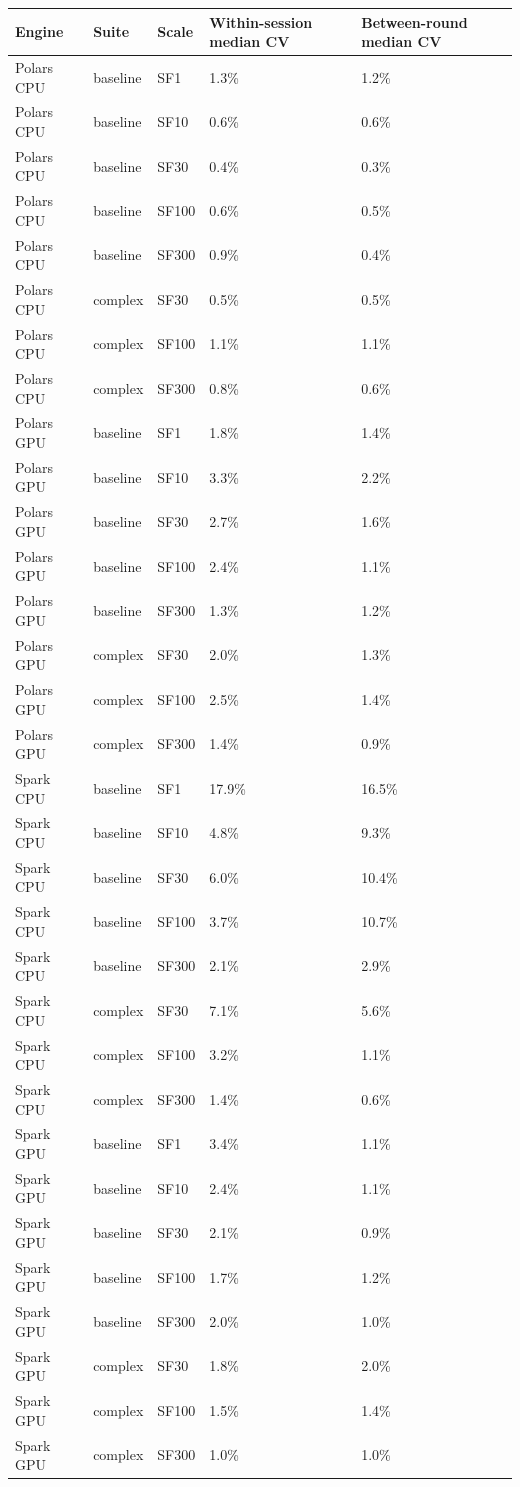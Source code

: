\begin{tabular}{lllll}
\toprule
Engine & Suite & Scale & Within-session median CV & Between-round median CV \\
\midrule
Polars CPU & baseline & SF1 & 1.3\% & 1.2\% \\
Polars CPU & baseline & SF10 & 0.6\% & 0.6\% \\
Polars CPU & baseline & SF30 & 0.4\% & 0.3\% \\
Polars CPU & baseline & SF100 & 0.6\% & 0.5\% \\
Polars CPU & baseline & SF300 & 0.9\% & 0.4\% \\
Polars CPU & complex & SF30 & 0.5\% & 0.5\% \\
Polars CPU & complex & SF100 & 1.1\% & 1.1\% \\
Polars CPU & complex & SF300 & 0.8\% & 0.6\% \\
Polars GPU & baseline & SF1 & 1.8\% & 1.4\% \\
Polars GPU & baseline & SF10 & 3.3\% & 2.2\% \\
Polars GPU & baseline & SF30 & 2.7\% & 1.6\% \\
Polars GPU & baseline & SF100 & 2.4\% & 1.1\% \\
Polars GPU & baseline & SF300 & 1.3\% & 1.2\% \\
Polars GPU & complex & SF30 & 2.0\% & 1.3\% \\
Polars GPU & complex & SF100 & 2.5\% & 1.4\% \\
Polars GPU & complex & SF300 & 1.4\% & 0.9\% \\
Spark CPU & baseline & SF1 & 17.9\% & 16.5\% \\
Spark CPU & baseline & SF10 & 4.8\% & 9.3\% \\
Spark CPU & baseline & SF30 & 6.0\% & 10.4\% \\
Spark CPU & baseline & SF100 & 3.7\% & 10.7\% \\
Spark CPU & baseline & SF300 & 2.1\% & 2.9\% \\
Spark CPU & complex & SF30 & 7.1\% & 5.6\% \\
Spark CPU & complex & SF100 & 3.2\% & 1.1\% \\
Spark CPU & complex & SF300 & 1.4\% & 0.6\% \\
Spark GPU & baseline & SF1 & 3.4\% & 1.1\% \\
Spark GPU & baseline & SF10 & 2.4\% & 1.1\% \\
Spark GPU & baseline & SF30 & 2.1\% & 0.9\% \\
Spark GPU & baseline & SF100 & 1.7\% & 1.2\% \\
Spark GPU & baseline & SF300 & 2.0\% & 1.0\% \\
Spark GPU & complex & SF30 & 1.8\% & 2.0\% \\
Spark GPU & complex & SF100 & 1.5\% & 1.4\% \\
Spark GPU & complex & SF300 & 1.0\% & 1.0\% \\
\bottomrule
\end{tabular}

